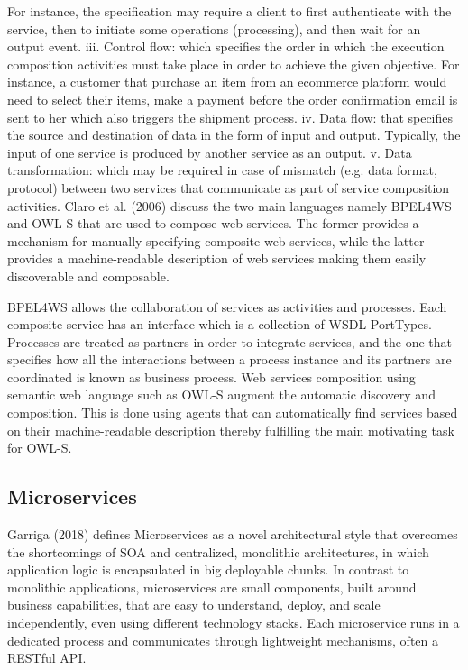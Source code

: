 \documentclass{article}
\begin{document}
\begin{multicols}{2}
For instance, the specification may require a client to first authenticate with the service, then to initiate some operations (processing), and then wait for an output event. iii. Control flow: which specifies the order in which the execution composition activities must take place in order to achieve the given objective. For instance, a customer that purchase an item from an ecommerce platform would need to select their items, make a payment before the order confirmation email is sent to her which also triggers the shipment process. iv. Data flow: that specifies the source and destination of data in the form of input and output. Typically, the input of one service is produced by another service as an output. v. Data transformation: which may be required in case of mismatch (e.g. data format, protocol) between two services that communicate as part of service composition activities.
Claro et al. (2006) discuss the two main languages namely BPEL4WS  and  OWL-S that are used to compose web  services. The former provides  a mechanism for manually specifying composite web services, while the latter provides a  machine-readable  description  of  web  services making them easily discoverable  and  composable. 

BPEL4WS  allows  the  collaboration of  services  as  activities  and  processes. Each composite service has an interface which is a collection of WSDL PortTypes. Processes are treated as partners in order to integrate services, and the one that specifies how  all the interactions between a process   instance  and  its  partners are coordinated is known as business process. Web services composition using  semantic web language such as OWL-S augment the automatic discovery and composition. This is done using agents that can  automatically find  services  based  on  their  machine-readable description thereby fulfilling the  main  motivating  task  for  OWL-S.
 
 \subsection{Microservices}
Garriga (2018) defines Microservices as a novel architectural style that overcomes the shortcomings of SOA and centralized, monolithic architectures, in which application logic is encapsulated in big deployable chunks. In contrast to monolithic applications, microservices are small components, built around business capabilities, that are easy to understand, deploy, and scale independently, even using different technology stacks. Each microservice runs in a dedicated process and communicates through lightweight mechanisms, often a RESTful API. 


\end{multicols}
\end{document}
